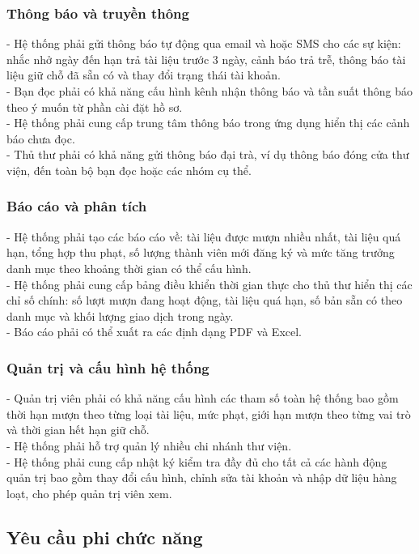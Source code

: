 \subsubsection{Thông báo và truyền thông}
- Hệ thống phải gửi thông báo tự động qua email và hoặc SMS cho các sự kiện: nhắc nhở ngày đến hạn trả tài liệu trước 3 ngày, cảnh báo trả trễ, thông báo tài liệu giữ chỗ đã sẵn có và thay đổi trạng thái tài khoản.\\
- Bạn đọc phải có khả năng cấu hình kênh nhận thông báo và tần suất thông báo theo ý muốn từ phần cài đặt hồ sơ.\\
- Hệ thống phải cung cấp trung tâm thông báo trong ứng dụng hiển thị các cảnh báo chưa đọc.\\
- Thủ thư phải có khả năng gửi thông báo đại trà, ví dụ thông báo đóng cửa thư viện, đến toàn bộ bạn đọc hoặc các nhóm cụ thể.\\
\subsubsection{Báo cáo và phân tích}
- Hệ thống phải tạo các báo cáo về: tài liệu được mượn nhiều nhất, tài liệu quá hạn, tổng hợp thu phạt, số lượng thành viên mới đăng ký và mức tăng trưởng danh mục theo khoảng thời gian có thể cấu hình. \\
- Hệ thống phải cung cấp bảng điều khiển thời gian thực cho thủ thư hiển thị các chỉ số chính: số lượt mượn đang hoạt động, tài liệu quá hạn, số bản sẵn có theo danh mục và khối lượng giao dịch trong ngày.\\
- Báo cáo phải có thể xuất ra các định dạng PDF và Excel. \\
\subsubsection{Quản trị và cấu hình hệ thống}
- Quản trị viên phải có khả năng cấu hình các tham số toàn hệ thống bao gồm thời hạn mượn theo từng loại tài liệu, mức phạt, giới hạn mượn theo từng vai trò và thời gian hết hạn giữ chỗ.\\
- Hệ thống phải hỗ trợ quản lý nhiều chi nhánh thư viện.\\
- Hệ thống phải cung cấp nhật ký kiểm tra đầy đủ cho tất cả các hành động quản trị bao gồm thay đổi cấu hình, chỉnh sửa tài khoản và nhập dữ liệu hàng loạt, cho phép quản trị viên xem.\\
\subsection{Yêu cầu phi chức năng}

